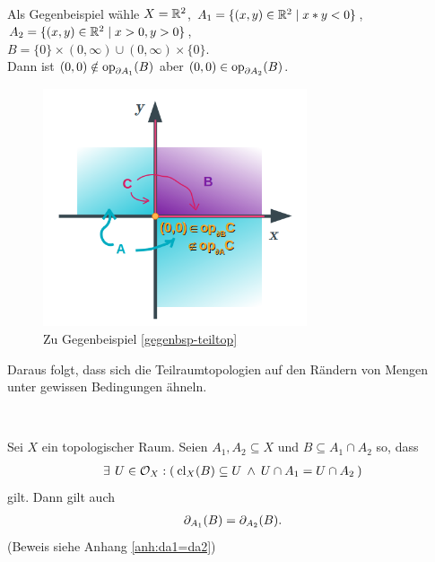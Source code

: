     \begin{gegenbsp}\label{gegenbsp-teiltop}\ \\
        Als Gegenbeispiel wähle $X = \mathbb{R}^2$, ${A_1 = \{(x,y) \in \mathbb{R}^2 \mid x*y < 0\}}$, ${A_2 = \{(x,y) \in \mathbb{R}^2 \mid x > 0, y > 0\}}$, \\
        ${B = \{0\} \times (0, \infty) \cup (0,\infty) \times \{0\}}$.\\
        Dann ist ${(0,0) \notin \text{op}_{\partial A_1}(B)}$ aber ${(0,0) \in \text{op}_{\partial A_2}(B)}$.
    \end{gegenbsp}
    \begin{figure}[ht]
        \centering
        \includegraphics[height=7cm]{gfx/gegenbsp-teilraumtop.png}
        \caption{Zu Gegenbeispiel \ref{gegenbsp-teiltop}}
        \label{fig:gegenbsp-teilraumtop}
    \end{figure}

    Daraus folgt, dass sich die Teilraumtopologien auf den Rändern von Mengen unter gewissen Bedingungen ähneln.
    \begin{satz}\label{satz:da1=da2} \ \vspace{8pt}

        \noindent
        Sei $X$ ein topologischer Raum. Seien $A_1, A_2 \subseteq X$ und $B \subseteq A_1 \cap A_2$ so, dass
        \begin{align*}
            \exists\: \, U \in \mathcal{O}_X: (\: \text{cl}_X(B) \subseteq U \:\land\: U \cap A_1 = U \cap A_2 \:)
        \end{align*}
        gilt. Dann gilt auch  
        \begin{align*}
            \partial_{A_1}(B) = \partial_{A_2}(B).
        \end{align*}
        (Beweis siehe Anhang \ref{anh:da1=da2})
        
    \end{satz}

